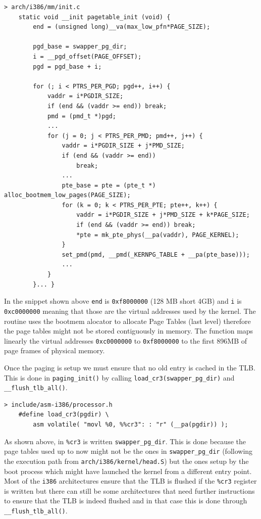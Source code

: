 \documentclass[twoside]{article}
\begin{document}
\begin{verbatim}
> arch/i386/mm/init.c
    static void __init pagetable_init (void) {
        end = (unsigned long)__va(max_low_pfn*PAGE_SIZE);

        pgd_base = swapper_pg_dir;
        i = __pgd_offset(PAGE_OFFSET);
        pgd = pgd_base + i;

        for (; i < PTRS_PER_PGD; pgd++, i++) {
            vaddr = i*PGDIR_SIZE;
            if (end && (vaddr >= end)) break;
            pmd = (pmd_t *)pgd;
            ... 
            for (j = 0; j < PTRS_PER_PMD; pmd++, j++) {
                vaddr = i*PGDIR_SIZE + j*PMD_SIZE;
                if (end && (vaddr >= end))
                    break;
                ...
                pte_base = pte = (pte_t *) alloc_bootmem_low_pages(PAGE_SIZE);
                for (k = 0; k < PTRS_PER_PTE; pte++, k++) {
                    vaddr = i*PGDIR_SIZE + j*PMD_SIZE + k*PAGE_SIZE;
                    if (end && (vaddr >= end)) break;
                    *pte = mk_pte_phys(__pa(vaddr), PAGE_KERNEL);
                }
                set_pmd(pmd, __pmd(_KERNPG_TABLE + __pa(pte_base)));
                ...
            }
        }... }
\end{verbatim}

In the snippet shown above \texttt{end} is \texttt{0xf8000000} (128 MB short 4GB) and \texttt{i} is \texttt{0xc0000000} meaning that those are the virtual addresses used by the kernel. The routine uses the bootmem alocator to allocate Page Tables (last level) therefore the page tables might not be stored contiguously in memory. The function maps linearly the virtual addresses \texttt{0xc0000000} to \texttt{0xf8000000} to the first 896MB of page frames of physical memory.

Once the paging is setup we must ensure that no old entry is cached in the
TLB. This is done in \texttt{paging_init()} by calling 
\texttt{load_cr3(swapper_pg_dir)} and \texttt{__flush_tlb_all()}.

\begin{verbatim}
> include/asm-i386/processor.h
    #define load_cr3(pgdir) \
        asm volatile( "movl %0, %%cr3": : "r" (__pa(pgdir)) );
\end{verbatim}

As shown above, in \texttt{\%cr3} is written \texttt{swapper_pg_dir}.
This is done because the page tables used up to now might not be the ones
in \texttt{swapper_pg_dir} (following the execution path from
\texttt{arch/i386/kernel/head.S}) but the ones setup by the boot process
which might have launched the kernel from a different entry point.
Most of the \texttt{i386} architectures ensure that
the TLB is flushed if the \texttt{\%cr3} register is written but
there can still be some architectures that need further instructions to ensure that
the TLB is indeed flushed and in that case this is done through
\texttt{__flush_tlb_all()}.
\end{document}
